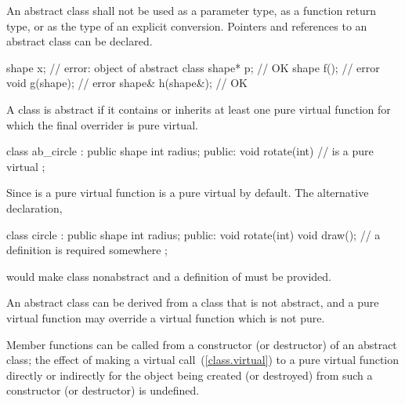 \pnum
{}%
An abstract class shall not be used as a parameter type, as a function
return type, or as the type of an explicit conversion. Pointers and
references to an abstract class can be declared.
\enterexample
\begin{codeblock}
shape x;                        // error: object of abstract class
shape* p;                       // OK
shape f();                      // error
void g(shape);                  // error
shape& h(shape&);               // OK
\end{codeblock}
\exitexample

\pnum
{}%
A class is abstract if it contains or inherits at least one pure virtual
function for which the final overrider is pure virtual.
\enterexample
\begin{codeblock}
class ab_circle : public shape {
  int radius;
public:
  void rotate(int) { }
  //  is a pure virtual
};
\end{codeblock}

Since  is a pure virtual function
 is a pure virtual by default. The alternative
declaration,
\begin{codeblock}
class circle : public shape {
  int radius;
public:
  void rotate(int) { }
  void draw();                  // a definition is required somewhere
};
\end{codeblock}
would make class  nonabstract and a definition of
 must be provided.
\exitexample

\pnum
\enternote
An abstract class can be derived from a class that is not abstract, and
a pure virtual function may override a virtual function which is not
pure.
\exitnote

\pnum
{}%
Member functions can be called from a constructor (or destructor) of an
abstract class;
%
the effect of making a virtual call~(\ref{class.virtual}) to a pure
virtual function directly or indirectly for the object being created (or
destroyed) from such a constructor (or destructor) is undefined.%
